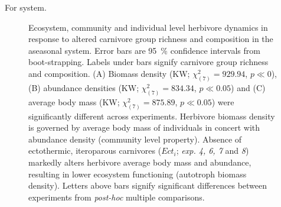 For   system. 

\begin{figure}
\centering

\caption[Ecosystem, community and individual level response to altered carnivore group richness and composition in the aseasonal system]{Ecosystem, community and individual level herbivore dynamics in response to altered carnivore group richness and composition in the aseasonal system. Error bars are 95~\% confidence intervals from boot-strapping. Labels under bars signify carnivore group richness and composition. (A) Biomass density (KW; $\chi^{2}_{(7)} = 929.94$, $p \ll 0$), (B) abundance densities (KW; $\chi^{2}_{(7)} = 834.34$, $p \ll 0.05$) and (C) average body mass (KW; $\chi^{2}_{(7)} = 875.89$, $p \ll 0.05$) were significantly different across experiments. Herbivore biomass density is governed by average body mass of individuals in concert with abundance density (community level property). Absence of ectothermic, iteroparous carnivores ($Ect_i$; \textit{exp. 4, 6, 7} and \textit{8}) markedly alters herbivore average body mass and abundance, resulting in lower ecosystem functioning (autotroph biomass density). Letters above bars signify significant differences between experiments from \textit{post-hoc} multiple comparisons. }
\label{fig:chap:res:dyn:cell0}
\end{figure}




%


